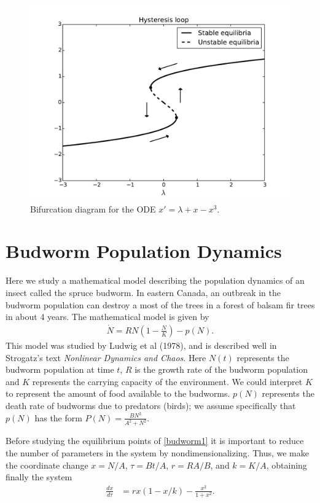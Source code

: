 \begin{figure}[ht]
\centering
\includegraphics[width=\textwidth]{HysteresisBifurcation.pdf}
\caption{Bifurcation diagram for the ODE $x' = \lambda + x - x^3$. }
\label{bifurcation:hysteresis}
\end{figure}


\section{Budworm Population Dynamics}
Here we study a mathematical model describing the population dynamics of an insect called the spruce budworm.
In eastern Canada, an outbreak in the budworm population can destroy a most of the trees in a forest of balsam fir trees in about 4 years.
The mathematical model is given by 
\begin{align}
\dot{N} = RN\left(1 - \frac{N}{K}\right) - p(N). \label{budworm1}
\end{align}
This model was studied by Ludwig et al (1978), and is described well in Strogatz's text \emph{Nonlinear Dynamics and Chaos}.
Here $N(t)$ represents the budworm population at time $t$, $R$ is the growth rate of the budworm population and $K$ represents the carrying capacity of the environment.
We could interpret $K$ to represent the amount of food available to the budworms. 
$p(N)$ represents the death rate of budworms due to predators (birds); we assume specifically that $p(N)$ has the form $P(N) = \frac{BN^2}{A^2 + N^2}$.

Before studying the equilibrium points of \eqref{budworm1} it is important to reduce the number of parameters in the system by nondimensionalizing.
Thus, we make the coordinate change $x = N/A$, $\tau = Bt/A$, $r = RA/B$, and $k = K/A$, obtaining finally the system 
\begin{align}
	\frac{dx}{d \tau} &= rx(1-x/k) - \frac{x^2}{1+x^2}.
\end{align}

